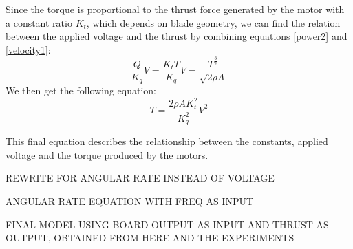 Since the torque is proportional to the thrust force generated by the motor with a constant ratio \textit{$K_t$}, which depends on blade geometry, we can find the relation between the applied voltage and the thrust by combining equations \ref{power2} and \ref{velocity1}:
\begin{equation}
\label{voltage2}
	\frac{Q}{K_q}V = \frac{K_tT}{K_q}V = \frac{T^\frac{3}{2}}{\sqrt{2\rho A}}
\end{equation}
We then get the following equation:
\begin{equation}
\label{thrust1}
	T = \frac{2\rho AK_t^2}{K_q^2}V^2
\end{equation}

This final equation describes the relationship between the constants, applied voltage and the torque produced by the motors.

REWRITE FOR ANGULAR RATE INSTEAD OF VOLTAGE

ANGULAR RATE EQUATION WITH FREQ AS INPUT

FINAL MODEL USING BOARD OUTPUT AS INPUT AND THRUST AS OUTPUT, OBTAINED FROM HERE AND THE EXPERIMENTS